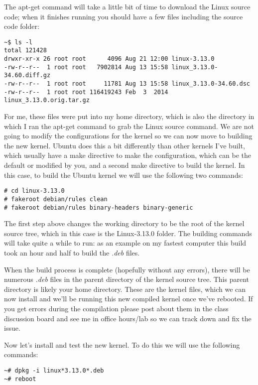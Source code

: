 \documentclass[11pt]{article}
\begin{document}
The apt-get command will take a little bit of time to download the Linux source code; when it finishes running you should have a few files including the source code folder:

\begin{verbatim}
~$ ls -l
total 121428
drwxr-xr-x 26 root root      4096 Aug 21 12:00 linux-3.13.0
-rw-r--r--  1 root root   7902814 Aug 13 15:58 linux_3.13.0-34.60.diff.gz
-rw-r--r--  1 root root     11781 Aug 13 15:58 linux_3.13.0-34.60.dsc
-rw-r--r--  1 root root 116419243 Feb  3  2014 linux_3.13.0.orig.tar.gz
\end{verbatim}

For me, these files were put into my home directory, which is also the directory in which I ran the apt-get command to grab the Linux source command. We are not going to modify the configurations for the kernel so we can now move to building the new kernel. Ubuntu does this a bit differently than other kernels I've built, which usually have a make directive to make the configuration, which can be the default or modified by you, and a second make directive to build the kernel. In this case, to build the Ubuntu kernel we will use the following two commands:

\begin{verbatim}
# cd linux-3.13.0
# fakeroot debian/rules clean
# fakeroot debian/rules binary-headers binary-generic
\end{verbatim}

The first step above changes the working directory to be the root of the kernel source tree, which in this case is the Linux-3.13.0 folder. The building commands will take quite a while to run: as an example on my fastest computer this build took an hour and half to build the \emph{.deb} files. 

When the build process is complete (hopefully without any errors), there will be numerous \emph{.deb} files in the parent directory of the kernel source tree. This parent directory is likely your home directory. These are the kernel files, which we can now install and we'll be running this new compiled kernel once we've rebooted. If you get errors during the compilation please post about them in the class discussion board and see me in office hours/lab so we can track down and fix the issue.

Now let's install and test the new kernel. To do this we will use the following commands:

\begin{verbatim}
~# dpkg -i linux*3.13.0*.deb
~# reboot
\end{verbatim}
\end{document}
